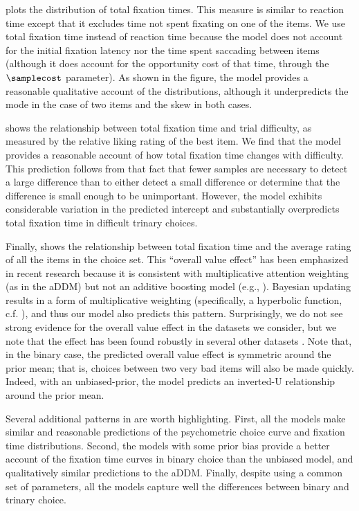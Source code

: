  plots the distribution of total fixation times. This measure is similar to reaction time except that it excludes time not spent fixating on one of the items. We use total fixation time instead of reaction time because the model does not account for the initial fixation latency nor the time spent saccading between items (although it does account for the opportunity cost of that time, through the $\samplecost$ parameter). As shown in the figure, the model provides a reasonable qualitative account of the distributions, although it underpredicts the mode in the case of two items and the skew in both cases.

 shows the relationship between total fixation time and trial difficulty, as measured by the relative liking rating of the best item. We find that the model provides a reasonable account of how total fixation time changes with difficulty. This prediction follows from that fact that fewer samples are necessary to detect a large difference than to either detect a small difference or determine that the difference is small enough to be unimportant. However, the model exhibits considerable variation in the predicted intercept and substantially overpredicts total fixation time in difficult trinary choices.

Finally,  shows the relationship between total fixation time and the average rating of all the items in the choice set. This ``overall value effect'' has been emphasized in recent research \citep{smith2019gaze,krajbich2018accounting} because it is consistent with multiplicative attention weighting (as in the aDDM) but not an additive boosting model (e.g., \citealp{cavanagh2014eye}). Bayesian updating results in a form of multiplicative weighting (specifically, a hyperbolic function, c.f. \citealp{armel2008neuroeconomic}), and thus our model also predicts this pattern. Surprisingly, we do not see strong evidence for the overall value effect in the datasets we consider, but we note that the effect has been found robustly in several other datasets \citep{smith2019gaze,fromer2019goal,hunt2012mechanisms,polania2014neural,pirrone2018evidence}. Note that, in the binary case, the predicted overall value effect is symmetric around the prior mean; that is, choices between two very bad items will also be made quickly. Indeed, with an unbiased-prior, the model predicts an inverted-U relationship around the prior mean. 


Several additional patterns in  are worth highlighting. First, all the models make similar and reasonable predictions of the psychometric choice curve and fixation time distributions. Second, the models with some prior bias provide a better account of the fixation time curves in binary choice than the unbiased model, and qualitatively similar predictions to the aDDM. Finally, despite using a common set of parameters, all the models capture well the differences between binary and trinary choice. 

